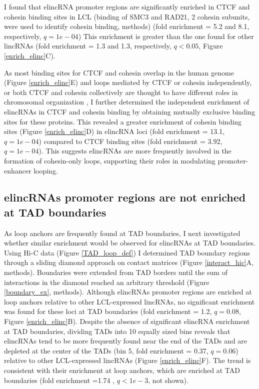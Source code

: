 \documentclass[11pt,a4paper]{report}
\begin{document}
I found that elincRNA promoter regions are significantly enriched in CTCF and cohesin binding sites in LCL (binding of SMC3 and RAD21, 2 cohesin subunits, were used to identify cohesin binding, methods) (fold enrichment = 5.2 and 8.1, respectively, $q=1e-04$) This enrichment is greater than the one found for other lincRNAs (fold enrichment = 1.3 and 1.3, respectively, $q<0.05$, Figure \ref{enrich_elinc}C).

As most binding sites for CTCF and cohesin overlap in the human genome (Figure \ref{enrich_elinc}E) and loops mediated by CTCF or cohesin independently, or both CTCF and cohesin collectively are thought to have different roles in chromosomal organization \cite{Ji2016}⁠, I further determined the independent enrichment of elincRNAs in CTCF and cohesin binding by obtaining mutually exclusive binding sites for these proteins. This revealed a greater enrichment of cohesin binding sites (Figure \ref{enrich_elinc}D) in elincRNA loci (fold enrichment = 13.1, $q=1e-04$) compared to CTCF binding sites (fold enrichment = 3.92, $q=1e-04$). This suggests elincRNAs are more frequently involved in the formation of cohesin-only loops, supporting their roles in modulating promoter-enhancer looping.

\subsection*{elincRNAs promoter regions are not enriched at TAD boundaries}

As loop anchors are frequently found at TAD boundaries, I next investigated whether similar enrichment would be observed for elincRNAs at TAD boundaries. Using Hi-C data (Figure \ref{TAD_loop_def}) I determined TAD boundary regions through a sliding diamond approach on contact matrices (Figure \ref{interact_hic}A, methods). Boundaries were extended from TAD borders until the sum of interactions in the diamond reached an arbitrary threshold (Figure \ref{boundary_ex}, methods). Although elincRNAs promoter regions are enriched at loop anchors relative to other LCL-expressed lincRNAs, no significant enrichment was found for these loci  at TAD boundaries (fold enrichment = 1.2, $q=0.08$, Figure \ref{enrich_elinc}B). Despite the absence of significant elincRNA enrichment at TAD boundaries, dividing TADs into 10 equally sized bins reveals that elincRNAs tend to be more frequently found near the end of the TADs and are depleted at the center of the TADs (bin 5, fold enrichment = 0.37, $q=0.06$) relative to other LCL-expressed lincRNAs (Figure \ref{enrich_elinc}F). The trend is consistent with their enrichment at loop anchors, which are enriched at TAD boundaries (fold enrichment =1.74 , $q<1e-3$, not shown).
\end{document}
